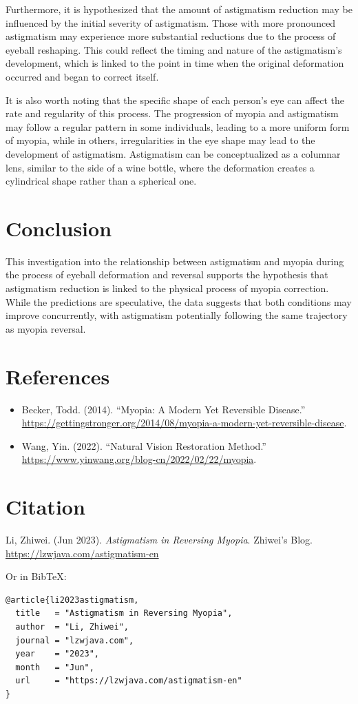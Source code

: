 \documentclass[12pt]{article}
\begin{document}
Furthermore, it is hypothesized that the amount of astigmatism reduction may be influenced by the initial severity of astigmatism. Those with more pronounced astigmatism may experience more substantial reductions due to the process of eyeball reshaping. This could reflect the timing and nature of the astigmatism’s development, which is linked to the point in time when the original deformation occurred and began to correct itself.

It is also worth noting that the specific shape of each person's eye can affect the rate and regularity of this process. The progression of myopia and astigmatism may follow a regular pattern in some individuals, leading to a more uniform form of myopia, while in others, irregularities in the eye shape may lead to the development of astigmatism. Astigmatism can be conceptualized as a columnar lens, similar to the side of a wine bottle, where the deformation creates a cylindrical shape rather than a spherical one.

\section{Conclusion}
This investigation into the relationship between astigmatism and myopia during the process of eyeball deformation and reversal supports the hypothesis that astigmatism reduction is linked to the physical process of myopia correction. While the predictions are speculative, the data suggests that both conditions may improve concurrently, with astigmatism potentially following the same trajectory as myopia reversal.

\section*{References}
\begin{itemize}
    \item Becker, Todd. (2014). ``Myopia: A Modern Yet Reversible Disease.'' \url{https://gettingstronger.org/2014/08/myopia-a-modern-yet-reversible-disease}.
    \item Wang, Yin. (2022). ``Natural Vision Restoration Method.'' \url{https://www.yinwang.org/blog-cn/2022/02/22/myopia}.
\end{itemize}

\section*{Citation}
Li, Zhiwei. (Jun 2023). \textit{Astigmatism in Reversing Myopia}. Zhiwei's Blog. \url{https://lzwjava.com/astigmatism-en}

Or in BibTeX:
\begin{verbatim}
@article{li2023astigmatism,
  title   = "Astigmatism in Reversing Myopia",
  author  = "Li, Zhiwei",
  journal = "lzwjava.com",
  year    = "2023",
  month   = "Jun",
  url     = "https://lzwjava.com/astigmatism-en"
}
\end{verbatim}
\end{document}
